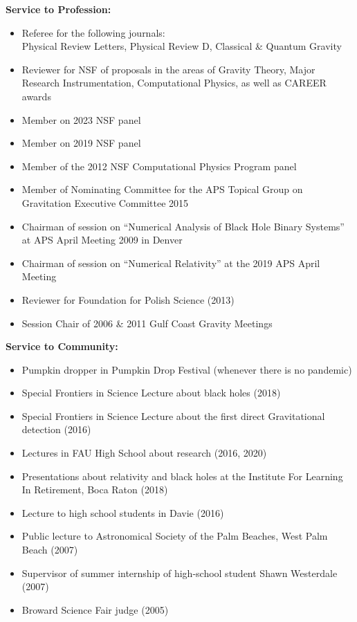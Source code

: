 \documentclass[11pt]{article}
\begin{document}
\bigskip

{\bf Service to Profession:}

\begin{itemize}
\item	Referee for the following journals:\\
	Physical Review Letters, Physical Review D,
	Classical \& Quantum Gravity
\item	Reviewer for NSF of proposals in the areas of Gravity Theory,
	Major Research Instrumentation, Computational Physics, as well as
	CAREER awards
\item	Member on 2023 NSF panel %
\item	Member on 2019 NSF panel %
\item	Member of the 2012 NSF Computational Physics Program panel
\item	Member of Nominating Committee for the APS Topical Group on
	Gravitation Executive Committee 2015
\item	Chairman of session on
	``Numerical Analysis of Black Hole Binary Systems''
	at APS April Meeting 2009 in Denver
\item	Chairman of session on ``Numerical Relativity''
	at the 2019 APS April Meeting
\item	Reviewer for Foundation for Polish Science (2013)
\item	Session Chair of 2006 \& 2011 Gulf Coast Gravity Meetings
\end{itemize}

\bigskip

{\bf Service to Community:}

\begin{itemize}
\item	Pumpkin dropper in Pumpkin Drop Festival
	(whenever there is no pandemic)
\item	Special Frontiers in Science Lecture about black holes (2018)
\item	Special Frontiers in Science Lecture about the first direct
	Gravitational detection (2016)
\item	Lectures in FAU High School about research (2016, 2020)
\item	Presentations about relativity and black holes at the
	Institute For Learning In Retirement, Boca Raton (2018)
\item	Lecture to high school students in Davie (2016)
\item	Public lecture to Astronomical Society of the Palm Beaches, 
	West Palm Beach (2007)
\item	Supervisor of summer internship of high-school 
	student Shawn Westerdale (2007)
\item	Broward Science Fair judge (2005)
\end{itemize}
\end{document}
